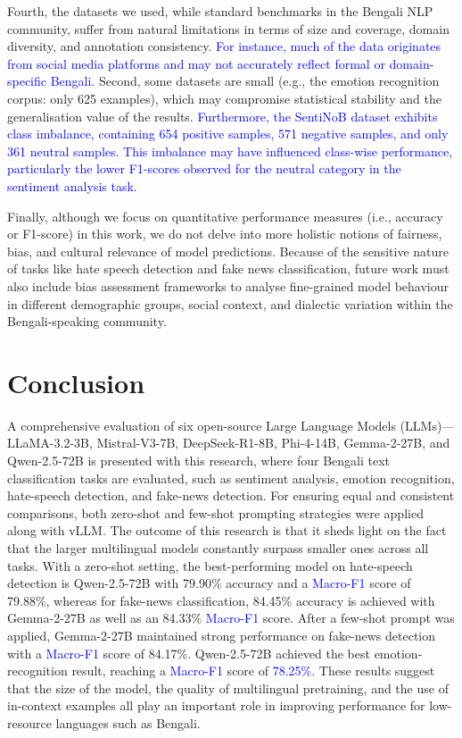 \documentclass[10pt,letterpaper]{article}
\newcommand{\rev}[1]{\textcolor{blue}{#1}}
\begin{document}
Fourth, the datasets we used, while standard benchmarks in the Bengali NLP community, suffer from natural limitations in terms of size and coverage, domain diversity, and annotation consistency. \rev{For instance, much of the data originates from social media platforms and may not accurately reflect formal or domain-specific Bengali.} Second, some datasets are small (e.g., the emotion recognition corpus: only 625 examples), which may compromise statistical stability and the generalisation value of the results. \rev{Furthermore, the SentiNoB dataset exhibits class imbalance, containing 654 positive samples, 571 negative samples, and only 361 neutral samples. This imbalance may have influenced class-wise performance, particularly the lower F1-scores observed for the neutral category in the sentiment analysis task.}


Finally, although we focus on quantitative performance measures (i.e., accuracy or F1-score) in this work, we do not delve into more holistic notions of fairness, bias, and cultural relevance of model predictions. Because of the sensitive nature of tasks like hate speech detection and fake news classification, future work must also include bias assessment frameworks to analyse fine-grained model behaviour in different demographic groups, social context, and dialectic variation within the Bengali-speaking community.


\section*{Conclusion}
\label{sec:conclusion} 

A comprehensive evaluation of six open-source Large Language Models (LLMs)—LLaMA-3.2-3B, Mistral-V3-7B, DeepSeek-R1-8B, Phi-4-14B, Gemma-2-27B, and Qwen-2.5-72B is presented with this research, where four Bengali text classification tasks are evaluated, such as sentiment analysis, emotion recognition, hate-speech detection, and fake-news detection. For ensuring equal and consistent comparisons, both zero-shot and few-shot prompting strategies were applied along with vLLM. The outcome of this research is that it sheds light on the fact that the larger multilingual models constantly surpass smaller ones across all tasks. With a zero-shot setting, the best-performing model on hate-speech detection is Qwen-2.5-72B with 79.90\% accuracy and a \rev{Macro-F1} score of 79.88\%, whereas for fake-news classification, 84.45\% accuracy is achieved with Gemma-2-27B as well as an 84.33\% \rev{Macro-F1} score. After a few-shot prompt was applied, Gemma-2-27B maintained strong performance on fake-news detection with a \rev{Macro-F1} score of 84.17\%. Qwen-2.5-72B achieved the best emotion-recognition result, reaching a \rev{Macro-F1} score of \rev{78.25\%}. These results suggest that the size of the model, the quality of multilingual pretraining, and the use of in-context examples all play an important role in improving performance for low-resource languages such as Bengali.
\end{document}
